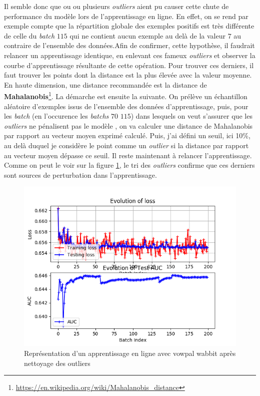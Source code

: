        Il semble donc que ou ou plusieurs \emph{outliers} aient pu causer cette chute de performance du modèle lors de l'apprentissage en ligne. En effet, on se rend par exemple compte que la répartition globale des exemples positifs est très différente de celle du \emph{batch} $115$ qui ne contient aucun exemple au delà de la valeur $7$ au contraire de l'ensemble des données.Afin de confirmer, cette hypothèse, il faudrait relancer un apprentissage identique, en enlevant ces fameux \emph{outliers} et observer la courbe d'apprentissage résultante de cette opération. Pour trouver ces derniers, il faut trouver les points dont la distance est la plus élevée avec la valeur moyenne. En haute dimension, une distance recommandée est la distance de \textbf{Mahalanobis}\footnote{\url{https://en.wikipedia.org/wiki/Mahalanobis_distance}}. La démarche est ensuite la suivante. On prélève un échantillon aléatoire d'exemples issus de l'ensemble des données d'apprentissage, puis, pour les \emph{batch} (en l'occurence les \emph{batchs} $70$ $115$) dans lesquels on veut s'assurer que les \emph{outliers}  ne pénalisent pas le modèle , on va calculer une distance de Mahalanobis par rapport au vecteur moyen exprimé calculé. Puis, j'ai défini un seuil, ici 10\%, au delà duquel je considère le point comme un \emph{outlier} si la distance par rapport au vecteur moyen dépasse ce seuil. Il reste maintenant à relancer l'apprentissage. Comme on peut le voir sur la figure \ref{fig:exp_outliers_last}, le tri des \emph{outliers} confirme que ces derniers sont sources de perturbation dans l'apprentissage. 
        \begin{figure}[h]
            \label{fig:exp_outliers_last}
            \centering
            \includegraphics[scale=0.75]{images/experiment_outliers_last.png}
            \caption{Représentation d'un apprentissage en ligne avec vowpal wabbit après nettoyage des outliers}
        \end{figure}
